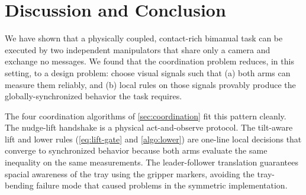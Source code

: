 \section{Discussion and Conclusion}
\label{sec:conclusion}
We have shown that a physically coupled, contact-rich bimanual task can be executed by two independent manipulators that share
only a camera and exchange no messages. We found that the coordination problem reduces, in this setting, to a design problem: choose visual signals such that (a) both arms can measure them reliably, and (b) local rules on those signals provably produce the globally-synchronized behavior the task requires.

The four coordination algorithms of \cref{sec:coordination} fit this pattern cleanly. The nudge-lift handshake is a physical act-and-observe protocol. The tilt-aware lift and lower rules
(\eqref{eq:lift-gate} and \cref{algo:lower}) are one-line local
decisions that converge to synchronized behavior because both arms evaluate the same inequality on the same measurements. The
leader-follower translation guarantees spacial awareness of the tray using the gripper markers, avoiding the tray-bending failure mode that caused problems in the symmetric implementation.

